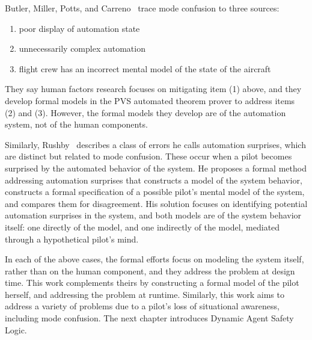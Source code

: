 Butler, Miller, Potts, and Carreno~\cite{ButlerModeConfusion} trace mode confusion to three sources:
\begin{enumerate}
	\item poor display of automation state
	\item unnecessarily complex automation
	\item flight crew has an incorrect mental model of the state of the aircraft
\end{enumerate}

\noindent They say human factors research focuses on mitigating item (1) above, and they develop formal models in the PVS automated theorem prover to address items (2) and (3). However, the formal models they develop are of the automation system, not of the human components.

Similarly, Rushby~\cite{Rushby_Mode_Confusion} describes a class of errors he calls automation surprises, which are distinct but related to mode confusion. These occur when a pilot becomes surprised by the automated behavior of the system. He proposes a formal method addressing automation surprises that constructs a model of the system behavior, constructs a formal specification of a possible pilot's mental model of the system, and compares them for disagreement. His solution focuses on identifying potential automation surprises in the system, and both models are of the system behavior itself: one directly of the model, and one indirectly of the model, mediated through a hypothetical pilot's mind.

In each of the above cases, the formal efforts focus on modeling the system itself, rather than on the human component, and they address the problem at design time. This work complements theirs by constructing a formal model of the pilot herself, and addressing the problem at runtime. Similarly, this work aims to address a variety of problems due to a pilot's loss of situational awareness, including mode confusion. The next chapter introduces Dynamic Agent Safety Logic.